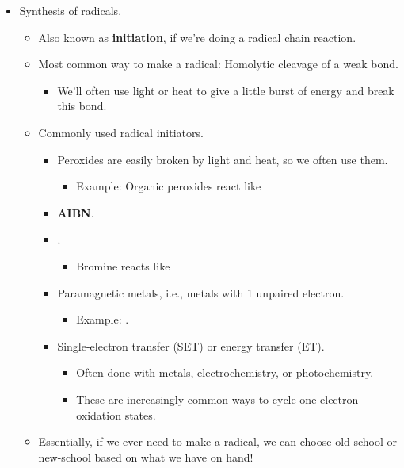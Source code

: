\documentclass[../notes.tex]{subfiles}
\begin{document}
\begin{itemize}
    \item Synthesis of radicals.
    \begin{itemize}
        \item Also known as \textbf{initiation}, if we're doing a radical chain reaction.
        \item Most common way to make a radical: Homolytic cleavage of a weak bond.
        \begin{itemize}
            \item We'll often use light or heat to give a little burst of energy and break this bond.
        \end{itemize}
        \item Commonly used radical initiators.
        \begin{itemize}
            \item Peroxides are easily broken by light and heat, so we often use them.
            \begin{itemize}
                \item Example: Organic peroxides react like 
            \end{itemize}
            \item \textbf{AIBN}.
            \item {}.
            \begin{itemize}
                \item Bromine reacts like 
            \end{itemize}
            \item Paramagnetic metals, i.e., metals with 1 unpaired electron.
            \begin{itemize}
                \item Example: \textbf{}.
            \end{itemize}
            \item Single-electron transfer (SET) or energy transfer (ET).
            \begin{itemize}
                \item Often done with metals, electrochemistry, or photochemistry.
                \item These are increasingly common ways to cycle one-electron oxidation states.
            \end{itemize}
        \end{itemize}
        \item Essentially, if we ever need to make a radical, we can choose old-school or new-school based on what we have on hand!

\end{itemize}
\end{itemize}
\end{document}
